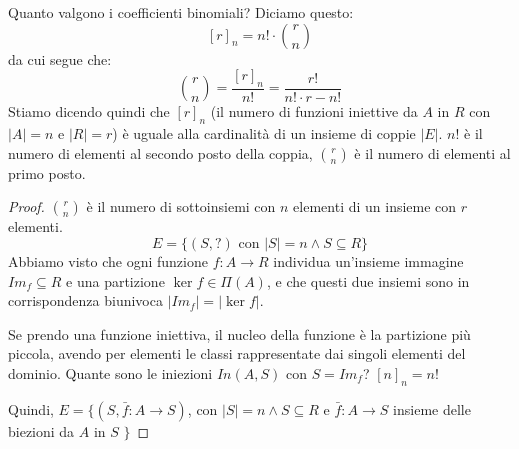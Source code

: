 
\begin{prop}
Quanto valgono i coefficienti binomiali? Diciamo questo:
\[
[r]_n = n! \cdot \binom{r}{n}
\]
da cui segue che:
\[
\binom{r}{n} = \frac{[r]_n}{n!} = \frac{r!}{n! \cdot {r-n}!}
\]
Stiamo dicendo quindi che $[r]_n$ (il numero di funzioni iniettive da $A$ in $R$ con $|A| = n$ e $|R| = r$) \`e uguale alla cardinalit\`a di un insieme di coppie $|E|$. $n!$ \`e il numero di elementi al secondo posto della coppia, $\binom{r}{n}$ \`e il numero di elementi al primo posto.
\end{prop}
\begin{proof}
$\binom{r}{n}$ \`e il numero di sottoinsiemi con $n$ elementi di un insieme con $r$ elementi.
\[
E = \{ (S, ?) \text{ con } |S| = n \land S \subseteq R \}
\]
Abbiamo visto che ogni funzione $f : A \to R$ individua un'insieme immagine $Im_f \subseteq R$ e una partizione $\ker f \in \Pi(A)$, e che questi due insiemi sono in corrispondenza biunivoca $|Im_f| = |\ker f |$.

Se prendo una funzione iniettiva, il nucleo della funzione \`e la partizione pi\`u piccola, avendo per elementi le classi rappresentate dai singoli elementi del dominio. Quante sono le iniezioni $In(A, S)$ con $S = Im_f$? $[n]_n = n!$

Quindi, $ E = \{ (S, \bar f : A \to S) $, con $ |S| = n \land S \subseteq R $ e $\bar f : A \to S$ insieme delle biezioni da $A$ in $S$ $\}$
\end{proof}

